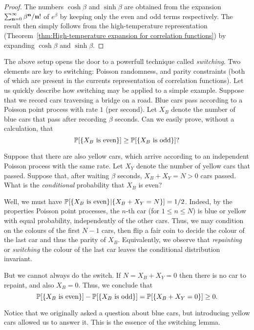 \begin{proof}
    The numbers $\cosh\beta$ and $\sinh\beta$ are obtained from the expansion
    $\sum_{\mathbf{n}=0}^\infty \beta^{\mathbf{n}}/\mathbf{n}!$ of $e^\beta$ by keeping only
    the even and odd terms respectively.
    The result then simply follows from
    the high-temperature representation (Theorem~\ref{thm:High-temperature expansion for correlation functions})
    by
    expanding $\cosh\beta$ and $\sinh\beta$.
\end{proof}


\begin{remark}
    The above setup opens the door to a powerfull technique called \emph{switching}.
    Two elements are key to switching:
    Poisson randomness, and parity constraints
    (both of which are present in the currents representation of correlation functions).
    Let us quickly describe how switching may be applied to a simple example.
    Suppose that we record cars traversing a bridge on a road.
    Blue cars pass according to a Poisson point process with rate $1$ (per second).
    Let $X_B$ denote the number of blue cars that pass after recording $\beta$ seconds.
    Can we easily prove, without a calculation, that
    \[
        \P[\{\text{$X_B$ is even}\}]\geq \P[\{\text{$X_B$ is odd}\}]?
    \]

    Suppose that there are also yellow cars,
    which arrive according to an independent Poisson process with the same rate.
    Let $X_Y$ denote the number of yellow cars that passed.
    Suppose that, after waiting $\beta$ seconds, $X_B+X_Y=N>0$ cars passed.
    What is the \emph{conditional} probability that $X_B$ is even?

    Well, we must have $\P[\{\text{$X_B$ is even}\}|\{X_B+X_Y=N\}]=1/2$.
    Indeed, by the properties Poisson point processes,
    the $n$-th car (for $1\leq n\leq N$) is blue or yellow with equal probability, 
    independently of the other cars.
    Thus, we may condition on the colours of the first $N-1$ cars,
    then flip a fair coin to decide the colour of the last car
    and thus the parity of $X_B$.
    Equivalently, we observe that \emph{repainting} or \emph{switching}
    the colour of the last car leaves the conditional distribution invariant.

    But we cannot always do the switch.
    If $N=X_B+X_Y=0$
    then there is no car to repaint, and also
    $X_B=0$.
    Thus, we conclude that
    \[
        \P[\{\text{$X_B$ is even}\}]-\P[\{\text{$X_B$ is odd}\}]=\P[\{X_B+X_Y=0\}]\geq 0.
    \]
    
    Notice that we originally asked a question about blue cars,
    but introducing yellow cars allowed us to answer it.
    This is the essence of the switching lemma.
\end{remark}

